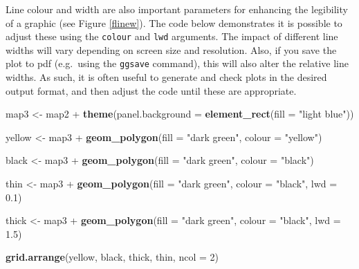 \documentclass[]{article}
\newenvironment{Shaded}{}{}
\newcommand{\KeywordTok}[1]{\textcolor[rgb]{0.00,0.44,0.13}{\textbf{{#1}}}}
\newcommand{\DataTypeTok}[1]{\textcolor[rgb]{0.56,0.13,0.00}{{#1}}}
\newcommand{\DecValTok}[1]{\textcolor[rgb]{0.25,0.63,0.44}{{#1}}}
\newcommand{\FloatTok}[1]{\textcolor[rgb]{0.25,0.63,0.44}{{#1}}}
\newcommand{\StringTok}[1]{\textcolor[rgb]{0.25,0.44,0.63}{{#1}}}
\newcommand{\NormalTok}[1]{{#1}}
\begin{document}

Line colour and width are also important parameters for enhancing the legibility of a graphic (see Figure \ref{flinew}). The code below demonstrates it
is possible to adjust these using the \texttt{colour} and \texttt{lwd}
arguments. The impact of different line widths will vary depending on screen size and resolution. Also, if you save the plot to pdf (e.g.~using
the \texttt{ggsave} command), this will also alter the relative line widths. As such, it is often useful to generate and check plots in the desired output format, and then adjust the code until these
are appropriate.

\begin{Shaded}
\begin{Highlighting}[]
\NormalTok{map3 <- map2 + }\KeywordTok{theme}\NormalTok{(}\DataTypeTok{panel.background =} \KeywordTok{element_rect}\NormalTok{(}\DataTypeTok{fill =} \StringTok{"light blue"}\NormalTok{))}

\NormalTok{yellow <- map3 + }\KeywordTok{geom_polygon}\NormalTok{(}\DataTypeTok{fill =} \StringTok{"dark green"}\NormalTok{, }\DataTypeTok{colour =} \StringTok{"yellow"}\NormalTok{)}

\NormalTok{black <- map3 + }\KeywordTok{geom_polygon}\NormalTok{(}\DataTypeTok{fill =} \StringTok{"dark green"}\NormalTok{, }\DataTypeTok{colour =} \StringTok{"black"}\NormalTok{)}

\NormalTok{thin <- map3 + }\KeywordTok{geom_polygon}\NormalTok{(}\DataTypeTok{fill =} \StringTok{"dark green"}\NormalTok{, }\DataTypeTok{colour =} \StringTok{"black"}\NormalTok{, }\DataTypeTok{lwd =} \FloatTok{0.1}\NormalTok{)}

\NormalTok{thick <- map3 + }\KeywordTok{geom_polygon}\NormalTok{(}\DataTypeTok{fill =} \StringTok{"dark green"}\NormalTok{, }\DataTypeTok{colour =} \StringTok{"black"}\NormalTok{, }\DataTypeTok{lwd =} \FloatTok{1.5}\NormalTok{)}

\KeywordTok{grid.arrange}\NormalTok{(yellow, black, thick, thin, }\DataTypeTok{ncol =} \DecValTok{2}\NormalTok{)}
\end{Highlighting}
\end{Shaded}
\end{document}
